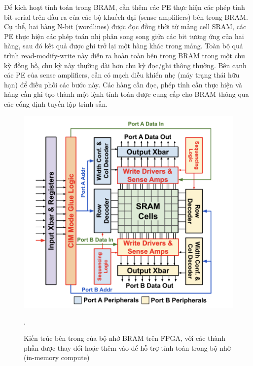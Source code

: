 \documentclass[a4paper]{article}
\begin{document}
Để kích hoạt tính toán trong BRAM, cần thêm các PE thực hiện các phép tính bit-serial trên đầu ra của các bộ khuếch đại (sense amplifiers) bên trong BRAM. Cụ thể, hai hàng N-bit (wordlines) được đọc đồng thời từ mảng cell SRAM, các PE thực hiện các phép toán nhị phân song song giữa các bit tương ứng của hai hàng, sau đó kết quả được ghi trở lại một hàng khác trong mảng. Toàn bộ quá trình read-modify-write này diễn ra hoàn toàn bên trong BRAM trong một chu kỳ đồng hồ, chu kỳ này thường dài hơn chu kỳ đọc/ghi thông thường. Bên cạnh các PE của sense amplifiers, cần có mạch điều khiển nhẹ (máy trạng thái hữu hạn) để điều phối các bước này. Các hàng cần đọc, phép tính cần thực hiện và hàng cần ghi tạo thành một lệnh tính toán được cung cấp cho BRAM thông qua các cổng định tuyến lập trình sẵn.

\begin{figure} [!h]
    \centering
    \includegraphics[width=0.75\linewidth]{assets/fpga_15.png}
    \caption{Kiến trúc bên trong của bộ nhớ BRAM trên FPGA, với các thành phần được thay đổi hoặc thêm vào để hỗ trợ tính toán trong bộ nhớ (in-memory compute)}.
    \label{fig:fpga_15}
\end{figure}
\end{document}
